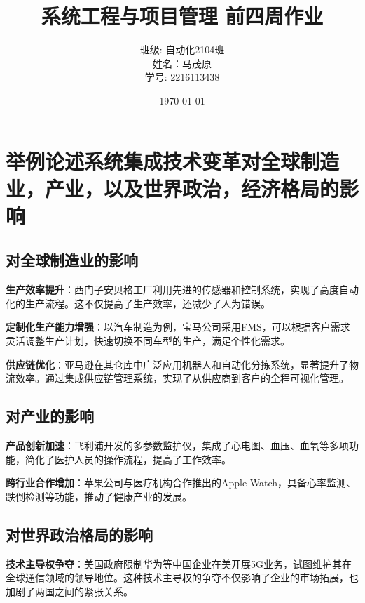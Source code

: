 \documentclass[UTF8,a4paper]{ctexart}
\begin{document}
	\title{\Huge 系统工程与项目管理 前四周作业}
	\author{
		\Large 班级: 自动化2104班 \\
		\Large 姓名：马茂原 \\
		\Large 学号: 2216113438
	}
	\date{\today}
	\maketitle
	
	\newpage

	\tableofcontents
	\newpage
	
	\setcounter{page}{1} %

		
	\section{举例论述系统集成技术变革对全球制造业，产业，以及世界政治，经济格局的影响}
	
	\subsection{对全球制造业的影响}
	\textbf{生产效率提升}：西门子安贝格工厂利用先进的传感器和控制系统，实现了高度自动化的生产流程。这不仅提高了生产效率，还减少了人为错误。
	
	\textbf{定制化生产能力增强}：以汽车制造为例，宝马公司采用FMS，可以根据客户需求灵活调整生产计划，快速切换不同车型的生产，满足个性化需求。
	
	\textbf{供应链优化}：亚马逊在其仓库中广泛应用机器人和自动化分拣系统，显著提升了物流效率。通过集成供应链管理系统，实现了从供应商到客户的全程可视化管理。
		
	\subsection{对产业的影响}
	\textbf{产品创新加速}：飞利浦开发的多参数监护仪，集成了心电图、血压、血氧等多项功能，简化了医护人员的操作流程，提高了工作效率。
	
	\textbf{跨行业合作增加}：苹果公司与医疗机构合作推出的Apple Watch，具备心率监测、跌倒检测等功能，推动了健康产业的发展。
	
	\subsection{对世界政治格局的影响}
	\textbf{技术主导权争夺}：美国政府限制华为等中国企业在美开展5G业务，试图维护其在全球通信领域的领导地位。这种技术主导权的争夺不仅影响了企业的市场拓展，也加剧了两国之间的紧张关系。
\end{document}
